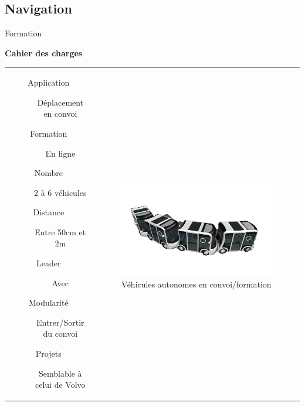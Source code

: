 \documentclass{beamer}
\begin{document}
\subsection*{Navigation}
\begin{frame}{Formation}
  \begin{center}
    \begin{Large}
      \textbf{Cahier des charges}
    \end{Large}
  \end{center}
  \begin{tabular}{c c}
    \begin{minipage}{0.6\linewidth}
      \begin{description}
      \item[Application] Déplacement en convoi
      \item[Formation] En ligne
      \item[Nombre] 2 à 6 véhicules
      \item[Distance] Entre 50cm et 2m
      \item[Leader] Avec
      \item[Modularité] Entrer/Sortir du convoi
      \item[Projets] Semblable à celui de Volvo
      \end{description}
    \end{minipage}
    &
    \begin{minipage}{0.4\linewidth}
      \begin{figure}
        \includegraphics[width=1.0\linewidth]{images/convoi.jpg}
        \caption{Véhicules autonomes en convoi/formation}
      \end{figure}
    \end{minipage}
  \end{tabular}

\end{frame}
\end{document}
